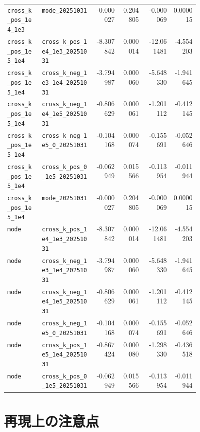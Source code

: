 \documentclass[a4paper,11pt]{jlreq}
\begin{document}
\begin{longtable}{p{0.18\linewidth}p{0.28\linewidth}r r r r}
\texttt{cross\_k\_pos\_1e4\_1e3} & \texttt{mode\_20251031}                    & -0.000027 & 0.204805 & -0.000069 &  0.000015 \\
\texttt{cross\_k\_pos\_1e5\_1e4} & \texttt{cross\_k\_pos\_1e4\_1e3\_20251031} & -8.307842 & 0.000014 & -12.061481 & -4.554203 \\
\texttt{cross\_k\_pos\_1e5\_1e4} & \texttt{cross\_k\_neg\_1e3\_1e4\_20251031} & -3.794987 & 0.000060 & -5.648330 & -1.941645 \\
\texttt{cross\_k\_pos\_1e5\_1e4} & \texttt{cross\_k\_neg\_1e4\_1e5\_20251031} & -0.806629 & 0.000061 & -1.201112 & -0.412145 \\
\texttt{cross\_k\_pos\_1e5\_1e4} & \texttt{cross\_k\_neg\_1e5\_0\_20251031}   & -0.104168 & 0.000074 & -0.155691 & -0.052646 \\
\texttt{cross\_k\_pos\_1e5\_1e4} & \texttt{cross\_k\_pos\_0\_1e5\_20251031}   & -0.062949 & 0.015566 & -0.113954 & -0.011944 \\
\texttt{cross\_k\_pos\_1e5\_1e4} & \texttt{mode\_20251031}                    & -0.000027 & 0.204805 & -0.000069 &  0.000015 \\
\texttt{mode}                    & \texttt{cross\_k\_pos\_1e4\_1e3\_20251031} & -8.307842 & 0.000014 & -12.061481 & -4.554203 \\
\texttt{mode}                    & \texttt{cross\_k\_neg\_1e3\_1e4\_20251031} & -3.794987 & 0.000060 & -5.648330 & -1.941645 \\
\texttt{mode}                    & \texttt{cross\_k\_neg\_1e4\_1e5\_20251031} & -0.806629 & 0.000061 & -1.201112 & -0.412145 \\
\texttt{mode}                    & \texttt{cross\_k\_neg\_1e5\_0\_20251031}   & -0.104168 & 0.000074 & -0.155691 & -0.052646 \\
\texttt{mode}                    & \texttt{cross\_k\_pos\_1e5\_1e4\_20251031} & -0.867424 & 0.000080 & -1.298330 & -0.436518 \\
\texttt{mode}                    & \texttt{cross\_k\_pos\_0\_1e5\_20251031}   & -0.062949 & 0.015566 & -0.113954 & -0.011944 \\
\bottomrule
\end{longtable}
\normalsize

\section{再現上の注意点}
\end{document}
